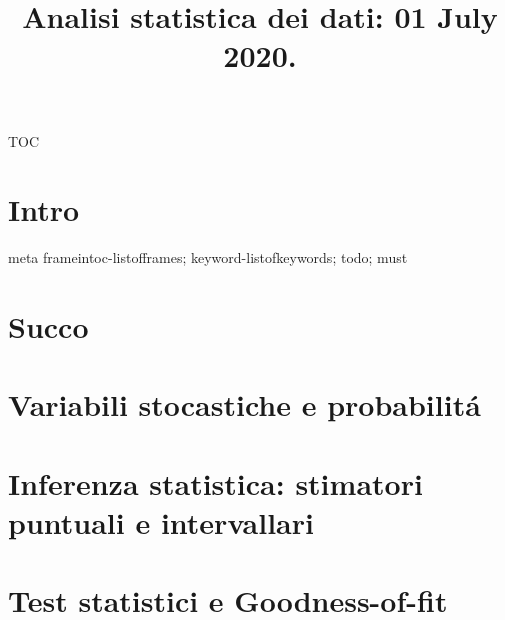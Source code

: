 \documentclass[t,10pt,xcolor={usenames},fleqn]{beamer}
\title{Analisi statistica dei dati: 01 July 2020.}
\begin{document}
\setcounter{tocdepth}{2}
{}
\begin{frame}
  \titlepage
\end{frame}

\begin{frame}[allowframebreaks]{TOC}
\tableofcontents[onlyparts]
\listofframes
\end{frame}

\part{Intro}
\begin{frame}{meta}
frameintoc-listofframes; keyword-listofkeywords; todo; must
\end{frame}



\part{Succo}


\part{Variabili stocastiche e probabilit\'a}


\part{Inferenza statistica: stimatori puntuali e intervallari}

\part{Test statistici e Goodness-of-fit}

\end{document}
